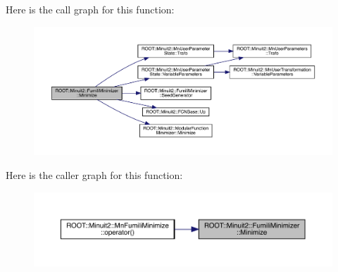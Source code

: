Here is the call graph for this function\+:\nopagebreak
\begin{figure}[H]
\begin{center}
\leavevmode
\includegraphics[width=350pt]{db/da1/classROOT_1_1Minuit2_1_1FumiliMinimizer_a3da0ec7b2ba7f876809f72d2f3054eec_cgraph}
\end{center}
\end{figure}
Here is the caller graph for this function\+:\nopagebreak
\begin{figure}[H]
\begin{center}
\leavevmode
\includegraphics[width=350pt]{db/da1/classROOT_1_1Minuit2_1_1FumiliMinimizer_a3da0ec7b2ba7f876809f72d2f3054eec_icgraph}
\end{center}
\end{figure}
\mbox{\label{classROOT_1_1Minuit2_1_1FumiliMinimizer_afe0f09e5e093e65ac8fadc13c459ad5c}} 
